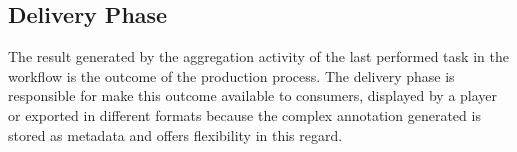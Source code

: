 




\subsection{Delivery Phase} 
The result generated by the aggregation activity of the last performed task in the workflow is the outcome of the production process. The delivery phase is responsible for make this outcome available to consumers, displayed by a player or exported in different formats because the complex annotation generated is stored as metadata and offers flexibility in this regard.











